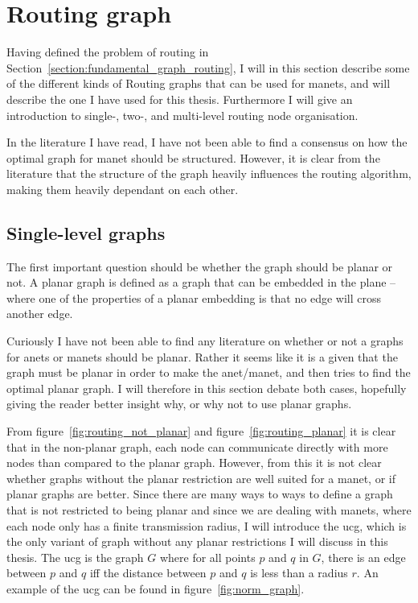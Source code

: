 \section{Routing graph}
\label{section:routing_graph}

Having defined the problem of routing in Section~\ref{section:fundamental_graph_routing}, I will in this section describe some of the different kinds of Routing graphs that can be used for \acp{manet}, and will describe the one I have used for this thesis. Furthermore I will give an introduction to single-, two-, and multi-level routing node organisation. 

In the literature I have read, I have not been able to find a consensus on how the optimal graph for \ac{manet} should be structured. However, it is clear from the literature that the structure of the graph heavily influences the routing algorithm, making them heavily dependant on each other. 

\subsection{Single-level graphs}
\label{single_level}
The first important question should be whether the graph should be planar or not. A planar graph is defined as a graph that can be embedded in the plane -- where one of the properties of a planar embedding is that no edge will cross another edge.

Curiously I have not been able to find any literature on whether or not a graphs for \acp{anet} or \acp{manet} should be planar. Rather it seems like it is a given that the graph must be planar in order to make the \ac{anet}/\ac{manet}, and then tries to find the optimal planar graph. I will therefore in this section debate both cases, hopefully giving the reader better insight why, or why not to use planar graphs.

From figure~\ref{fig:routing_not_planar} and figure~\ref{fig:routing_planar} it is clear that in the non-planar graph, each node can communicate directly with more nodes than compared to the planar graph. However, from this it is not clear whether graphs without the planar restriction are well suited for a \ac{manet}, or if planar graphs are better. Since there are many ways to ways to define a graph that is not restricted to being planar and since we are dealing with \acp{manet}, where each node only has a finite transmission radius, I will introduce the \ac{ucg}, which is the only variant of graph without any planar restrictions I will discuss in this thesis. The \ac{ucg} is the graph $G$ where for all points $p$ and $q$ in $G$, there is an edge between $p$ and $q$ iff the distance between $p$ and $q$ is less than a radius $r$. An example of the \ac{ucg} can be found in figure~\ref{fig:norm_graph}. 

